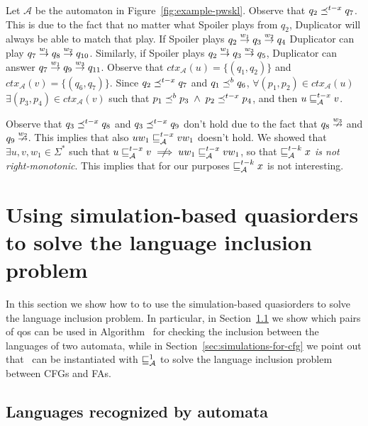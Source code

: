 \begin{example}
Let $\mathcal{A}$ be the automaton in Figure~\ref{fig:example-pwskl}.
Observe that $q_2 \preceq^{t-x} q_7$.
This is due to the fact that no matter what Spoiler plays from $q_2$,
Duplicator will always be able to match that play.
If Spoiler plays $q_2 \overset{w_1}{\rightarrow} q_3 \overset{w_2}{\rightarrow} q_4$
Duplicator can play $q_7 \overset{w_1}{\rightarrow} q_8 \overset{w_2}{\rightarrow} q_{10}$.
Similarly, if Spoiler plays $q_2 \overset{w_1}{\rightarrow} q_3 \overset{w_3}{\rightarrow} q_5$,
Duplicator can answer $q_7 \overset{w_1}{\rightarrow} q_9 \overset{w_3}{\rightarrow} q_{11}$.
Observe that $ctx_{\mathcal{A}}(u) = \{(q_1,q_2)\}$ and $ctx_{\mathcal{A}}(v) = \{(q_6,q_7)\}$.
Since $q_2 \preceq^{t-x} q_7$ and $q_1 \preceq^b q_6$, $\forall (p_1,p_2) \in ctx_{\mathcal{A}}(u)$
$\exists (p_3,p_4) \in ctx_{\mathcal{A}}(v)$
such that $p_1 \preceq^b p_3 \; \wedge \; p_2 \preceq^{t-x} p_4$,
and then $u \sqsubseteq_{\mathcal{A}}^{t-x} v$.

Observe that $q_3 \preceq^{t-x} q_8$ and $q_3 \preceq^{t-x} q_9$ don't hold
due to the fact that $q_8 \overset{w_3}{\nrightarrow}$ and $q_9 \overset{w_2}{\nrightarrow}$.
This implies that also $uw_1 \sqsubseteq_{\mathcal{A}}^{t-x} vw_1$ doesn't hold.
We showed that $\exists u,v,w_1 \in \Sigma^*$ such that
$u \pwst{A}{x} v \centernot\implies uw_1 \pwst{A}{x} vw_1$,
so that $\sqsubseteq_{\mathcal{A}}^{t-k}{x}$ \emph{is not right-monotonic}.
This implies that for our purposes $\sqsubseteq_{\mathcal{A}}^{t-k}{x}$ is not interesting.
\end{example}


\section{Using simulation-based quasiorders to solve the language inclusion problem}
\label{sec:using-qos}

In this section we show how to to use the simulation-based quasiorders to solve
the language inclusion problem.
In particular, in Section~\ref{sec:simulations-for-buchi} we show which pairs
of qos can be used in Algorithm~ for checking the inclusion
between the languages of two \Buchi{} automata, while in Section~\ref{sec:simulations-for-cfg}
we point out that~ can be instantiated with $\sqsubseteq^1_{\mathcal{A}}$
to solve the language inclusion problem between CFGs and FAs.


\subsection{Languages recognized by \Buchi{}  automata}
\label{sec:simulations-for-buchi}

